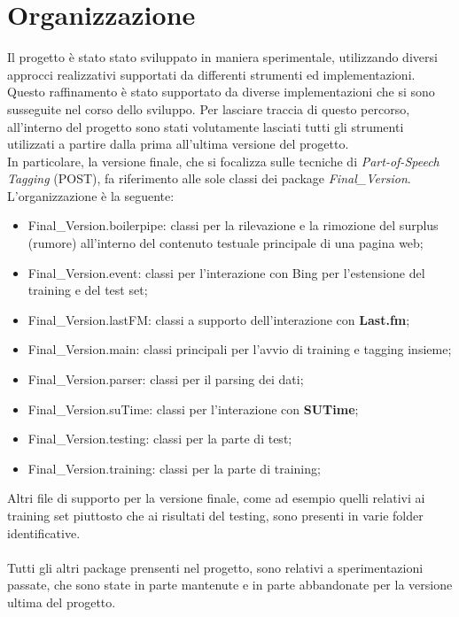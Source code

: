 \documentclass[a4paper]{report}
\begin{document}
\section{Organizzazione}
Il progetto è stato stato sviluppato in maniera sperimentale, utilizzando diversi approcci realizzativi supportati da differenti strumenti ed implementazioni. Questo raffinamento è stato supportato da diverse implementazioni che si sono susseguite nel corso dello sviluppo. Per lasciare traccia di questo percorso, all'interno del progetto sono stati volutamente lasciati tutti gli strumenti utilizzati a partire dalla prima all'ultima versione del progetto. \\
In particolare, la versione finale, che si focalizza sulle tecniche di \textit{Part-of-Speech Tagging} (POST), fa riferimento alle sole classi dei package \textit{Final\_Version}. \\L'organizzazione è la seguente:
\begin{itemize}
\item Final\_Version.boilerpipe: classi per la rilevazione e la rimozione del surplus (rumore) all'interno del contenuto testuale principale di una pagina web;
\item Final\_Version.event: classi per l'interazione con Bing per l'estensione del training e del test set;
\item Final\_Version.lastFM: classi a supporto dell'interazione con \textbf{Last.fm};
\item Final\_Version.main: classi principali per l'avvio di training e tagging insieme; 
\item Final\_Version.parser: classi per il parsing  dei dati;
\item Final\_Version.suTime: classi per l'interazione con \textbf{SUTime};
\item Final\_Version.testing: classi per la parte di test;
\item Final\_Version.training: classi per la parte di training;
\end{itemize}
Altri file di supporto per la versione finale, come ad esempio quelli relativi ai training set piuttosto che ai risultati del testing, sono presenti in varie folder identificative. \\ \\
Tutti gli altri package prensenti nel progetto, sono relativi a sperimentazioni passate, che sono state in parte mantenute e in parte abbandonate per la versione ultima del progetto. 
\end{document}
